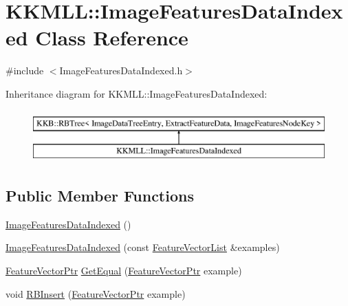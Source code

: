 \hypertarget{class_k_k_m_l_l_1_1_image_features_data_indexed}{}\section{K\+K\+M\+LL\+:\+:Image\+Features\+Data\+Indexed Class Reference}
\label{class_k_k_m_l_l_1_1_image_features_data_indexed}


{\ttfamily \#include $<$Image\+Features\+Data\+Indexed.\+h$>$}

Inheritance diagram for K\+K\+M\+LL\+:\+:Image\+Features\+Data\+Indexed\+:\begin{figure}[H]
\begin{center}
\leavevmode
\includegraphics[height=2.000000cm]{class_k_k_m_l_l_1_1_image_features_data_indexed}
\end{center}
\end{figure}
\subsection*{Public Member Functions}
\begin{DoxyCompactItemize}
\item 
\hyperlink{class_k_k_m_l_l_1_1_image_features_data_indexed_a860ba99bf243c975418af27447cd5d28}{Image\+Features\+Data\+Indexed} ()
\item 
\hyperlink{class_k_k_m_l_l_1_1_image_features_data_indexed_a1a433b946d075b0f3cc90dd5ab4f9d4e}{Image\+Features\+Data\+Indexed} (const \hyperlink{class_k_k_m_l_l_1_1_feature_vector_list}{Feature\+Vector\+List} \&examples)
\item 
\hyperlink{namespace_k_k_m_l_l_a0c5df3d48f45926fbc4fee04f5e3bc04}{Feature\+Vector\+Ptr} \hyperlink{class_k_k_m_l_l_1_1_image_features_data_indexed_ac1d88a8fca173b68de713c5131f16436}{Get\+Equal} (\hyperlink{namespace_k_k_m_l_l_a0c5df3d48f45926fbc4fee04f5e3bc04}{Feature\+Vector\+Ptr} example)
\item 
void \hyperlink{class_k_k_m_l_l_1_1_image_features_data_indexed_a74efce26e6c36ca48036f4bee1e3743f}{R\+B\+Insert} (\hyperlink{namespace_k_k_m_l_l_a0c5df3d48f45926fbc4fee04f5e3bc04}{Feature\+Vector\+Ptr} example)
\end{DoxyCompactItemize}

